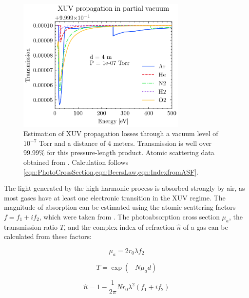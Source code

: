 \begin{figure}
	\centering
	\includegraphics[width=0.75\textwidth]{figures/chap2/XUVinVacuum.png}
	\caption{Estimation of XUV propagation losses through a vacuum level of $10^{-7}$ Torr and a distance of 4 meters. Transmission is well over 99.99\% for this pressure-length product. Atomic scattering data obtained from \cite{gulliksonCXROXRayInteractions,henkeXRayInteractionsPhotoabsorption1993}. Calculation follows \cref{eqn:PhotoCrossSection,eqn:BeersLaw,eqn:IndexfromASF}.}
	\label{fig:XUVinVacuum}
\end{figure}

The light generated by the high harmonic process is absorbed strongly by air, as most gases have at least one electronic transition in the XUV regime. The magnitude of absorption can be estimated using the atomic scattering factors $f = f_1 + i f_2$, which were taken from \cite{henkeXRayInteractionsPhotoabsorption1993}. The photoabsorption cross section $\mu_a$, the transmission ratio $T$, and the complex index of refraction $\hat{n}$ of a gas can be calculated from these factors:

\begin{equation}
\mu_a = 2 r_0 \lambda f_2
\label{eqn:PhotoCrossSection}
\end{equation}

\begin{equation}
T = \exp\left( -N \mu_a d \right)
\label{eqn:BeersLaw}
\end{equation}

\begin{equation}
\hat{n} = 1 - \frac{1}{2 \pi} N r_0 \lambda^2 \left(f_1 + i f_2\right)
\label{eqn:IndexfromASF}
\end{equation}


